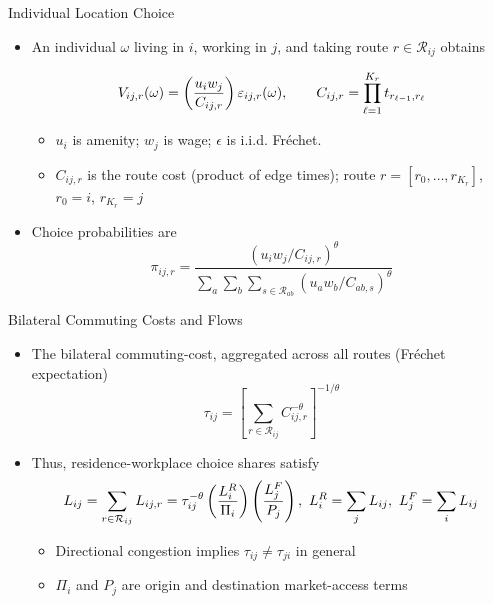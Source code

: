 \documentclass[11pt,aspectratio=169]{beamer}
\newcommand{\R}{\mathcal{R}}
\begin{document}
\begin{frame}{Individual Location Choice}
\begin{itemize}
  \item An individual $\omega$ living in $i$, working in $j$, and taking route $r\in\R_{ij}$ obtains
  \vspace{-0.5em}\begin{footnotesize}\begin{equation}
    V_{ij,r}(\omega) = \left( \frac{u_i w_j}{C_{ij,r}} \right)\varepsilon_{ij,r}(\omega),
    \qquad
    C_{ij,r} = \prod_{\ell=1}^{K_r} t_{r_{\ell-1},r_\ell}
  \vspace{-1.25em}\end{equation}\end{footnotesize}
  \begin{itemize}
    \item $u_i$ is amenity; $w_j$ is wage; $\epsilon$ is i.i.d. Fr\'echet.
    \item $C_{ij,r}$ is the route cost (product of edge times); route $r=[r_0,\dots,r_{K_r}]$, $r_0=i$, $r_{K_r}=j$
  \end{itemize}
  \vspace{0.5em}
  \item Choice probabilities are
  \vspace{-0.5em}\begin{equation}\label{eq:pi}
    \pi_{ij,r} = \frac{\left(u_i w_j/C_{ij,r}\right)^\theta}{\sum_{a}\sum_b\sum_{s\in\R_{ab}}\left(u_a w_b/C_{ab,s}\right)^\theta}
  \end{equation}
\end{itemize}
\end{frame}

\begin{frame}[label=bilateral]{Bilateral Commuting Costs and Flows}
\begin{itemize}
  \item The bilateral commuting-cost, aggregated across all routes (Fr\'echet expectation)
  \vspace{-0.5em}\begin{equation}
    \tau_{ij} = \left[ \sum_{r\in\R_{ij}} C_{ij,r}^{-\theta} \right]^{-1/\theta}
  \end{equation}
  \item Thus, residence-workplace choice shares satisfy
  \vspace{-0.25em}\begin{equation}\label{eq:gravity}
    L_{ij} = \sum_{r\in\R_{ij}}L_{ij,r} = \tau_{ij}^{-\theta} \left(\frac{L_i^R}{\Pi_i}\right) \left(\frac{L_j^F}{P_j}\right), \,\, L_i^R=\sum_jL_{ij}, \,\, L_j^F=\sum_iL_{ij}
  \vspace{-1em}\end{equation}
  \begin{itemize}
    \item Directional congestion implies $\tau_{ij}\neq\tau_{ji}$ in general
    \item $\Pi_i$ and $P_j$ are origin and destination market-access terms
  \end{itemize}
\end{itemize}
\end{frame}
\end{document}
